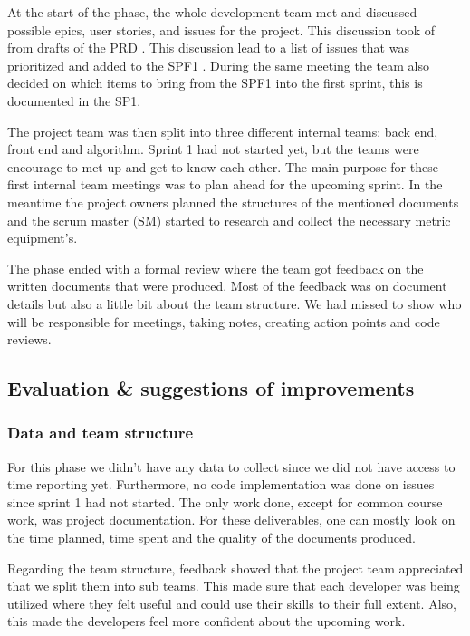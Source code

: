 \documentclass{article}
\begin{document}
At the start of the phase, the whole development team met and discussed possible epics, user stories, and issues for the project. This discussion took of from drafts of the PRD \cite{PRD}. This discussion lead to a list of issues that was prioritized and added to the SPF1 \cite{SPF1}. During the same meeting the team also decided on which items to bring from the SPF1 into the first sprint, this is documented in the SP1\cite{SP1}. 

The project team was then split into three different internal teams: back end, front end and algorithm. Sprint 1 had not started yet, but the teams were encourage to met up and get to know each other. The main purpose for these first internal team meetings was to plan ahead for the upcoming sprint. In the meantime the project owners planned the structures of the mentioned documents and the scrum master (SM) started to research and collect the necessary metric equipment's. 

The phase ended with a formal review where the team got feedback on the written documents that were produced. Most of the feedback was on document details but also a little bit about the team structure. We had missed to show who will be responsible for meetings, taking notes, creating action points and code reviews.

\subsection{Evaluation \& suggestions of improvements }

\subsubsection{Data and team structure}
For this phase we didn't have any data to collect since we did not have access to time reporting yet. Furthermore, no code implementation was done on issues since sprint 1 had not started. The only work done, except for common course work, was project documentation. For these deliverables, one can mostly look on the time planned, time spent and the quality of the documents produced. 

Regarding the team structure, feedback showed that the project team appreciated that we split them into sub teams. This made sure that each developer was being utilized where they felt useful and could use their skills to their full extent. Also, this made the developers feel more confident about the upcoming work. 
\end{document}
